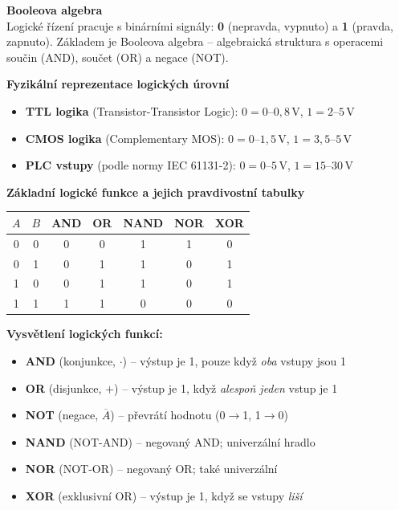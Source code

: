 \documentclass[a4paper,10pt]{article}
\begin{document}
\begin{vysvetlenibox}
\textbf{Booleova algebra}\\
Logické řízení pracuje s binárními signály: \textbf{0} (nepravda, vypnuto)
a \textbf{1} (pravda, zapnuto). Základem je Booleova algebra -- algebraická
struktura s operacemi součin (AND), součet (OR) a negace (NOT).

\textbf{Fyzikální reprezentace logických úrovní}
\begin{itemize}[noitemsep]
    \item \textbf{TTL logika} (Transistor-Transistor Logic):
          $0 = 0\text{--}0{,}8\,\text{V}$, $1 = 2\text{--}5\,\text{V}$
    \item \textbf{CMOS logika} (Complementary MOS):
          $0 = 0\text{--}1{,}5\,\text{V}$, $1 = 3{,}5\text{--}5\,\text{V}$
    \item \textbf{PLC vstupy} (podle normy IEC 61131-2):
          $0 = 0\text{--}5\,\text{V}$, $1 = 15\text{--}30\,\text{V}$
\end{itemize}

\textbf{Základní logické funkce a jejich pravdivostní tabulky}

\begin{center}
\begin{tabular}{cc|c|c|c|c|c}
    \toprule
    $A$ & $B$ & AND & OR & NAND & NOR & XOR \\
    \midrule
    0 & 0 & 0 & 0 & 1 & 1 & 0 \\
    0 & 1 & 0 & 1 & 1 & 0 & 1 \\
    1 & 0 & 0 & 1 & 1 & 0 & 1 \\
    1 & 1 & 1 & 1 & 0 & 0 & 0 \\
    \bottomrule
\end{tabular}
\end{center}

\textbf{Vysvětlení logických funkcí:}
\begin{itemize}[noitemsep, leftmargin=1.4em, topsep=4pt]
    \item \textbf{AND} (konjunkce, $\cdot$) -- výstup je 1, pouze když \textit{oba} vstupy jsou 1
    \item \textbf{OR} (disjunkce, $+$) -- výstup je 1, když \textit{alespoň jeden} vstup je 1
    \item \textbf{NOT} (negace, $\overline{A}$) -- převrátí hodnotu (0$\to$1, 1$\to$0)
    \item \textbf{NAND} (NOT-AND) -- negovaný AND; univerzální hradlo
    \item \textbf{NOR} (NOT-OR) -- negovaný OR; také univerzální
    \item \textbf{XOR} (exklusivní OR) -- výstup je 1, když se vstupy \textit{liší}
\end{itemize}


\end{vysvetlenibox}
\end{document}
